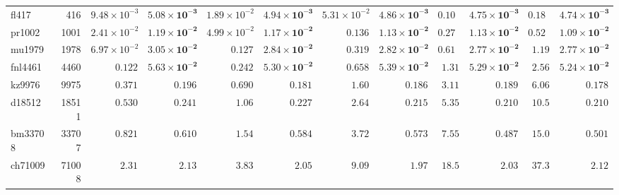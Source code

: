 \begin{table}[t]
{\begin{tabular}{@{}lr*{5}{rr}@{}}
fl417 & 416 & $9.48 \times 10^{-3}$ & $\mathbf{5.08 \times 10^{-3}}$ & $1.89 \times 10^{-2}$ & $\mathbf{4.94 \times 10^{-3}}$ & $5.31 \times 10^{-2}$ & $\mathbf{4.86 \times 10^{-3}}$ & $0.105$ & $\mathbf{4.75 \times 10^{-3}}$ & $0.185$ & $\mathbf{4.74 \times 10^{-3}}$ \\
pr1002 & 1001 & $2.41 \times 10^{-2}$ & $\mathbf{1.19 \times 10^{-2}}$ & $4.99 \times 10^{-2}$ & $\mathbf{1.17 \times 10^{-2}}$ & $0.136$ & $\mathbf{1.13 \times 10^{-2}}$ & $0.273$ & $\mathbf{1.13 \times 10^{-2}}$ & $0.520$ & $\mathbf{1.09 \times 10^{-2}}$ \\
mu1979 & 1978 & $6.97 \times 10^{-2}$ & $\mathbf{3.05 \times 10^{-2}}$ & $0.127$ & $\mathbf{2.84 \times 10^{-2}}$ & $0.319$ & $\mathbf{2.82 \times 10^{-2}}$ & $0.619$ & $\mathbf{2.77 \times 10^{-2}}$ & $1.19$ & $\mathbf{2.77 \times 10^{-2}}$ \\
fnl4461 & 4460 & $0.122$ & $\mathbf{5.63 \times 10^{-2}}$ & $0.242$ & $\mathbf{5.30 \times 10^{-2}}$ & $0.658$ & $\mathbf{5.39 \times 10^{-2}}$ & $1.31$ & $\mathbf{5.29 \times 10^{-2}}$ & $2.56$ & $\mathbf{5.24 \times 10^{-2}}$ \\
kz9976 & 9975 & $0.371$ & $\mathbf{0.196}$ & $0.690$ & $\mathbf{0.181}$ & $1.60$ & $\mathbf{0.186}$ & $3.11$ & $\mathbf{0.189}$ & $6.06$ & $\mathbf{0.178}$ \\
d18512 & 18511 & $0.530$ & $\mathbf{0.241}$ & $1.06$ & $\mathbf{0.227}$ & $2.64$ & $\mathbf{0.215}$ & $5.35$ & $\mathbf{0.210}$ & $10.5$ & $\mathbf{0.210}$ \\
bm33708 & 33707 & $0.821$ & $\mathbf{0.610}$ & $1.54$ & $\mathbf{0.584}$ & $3.72$ & $\mathbf{0.573}$ & $7.55$ & $\mathbf{0.487}$ & $15.0$ & $\mathbf{0.501}$ \\
ch71009 & 71008 & $2.31$ & $\mathbf{2.13}$ & $3.83$ & $\mathbf{2.05}$ & $9.09$ & $\mathbf{1.97}$ & $18.5$ & $\mathbf{2.03}$ & $37.3$ & $\mathbf{2.12}$ \\
\bottomrule
\end{tabular}%
}
\vspace{0.8em}
\end{table}
